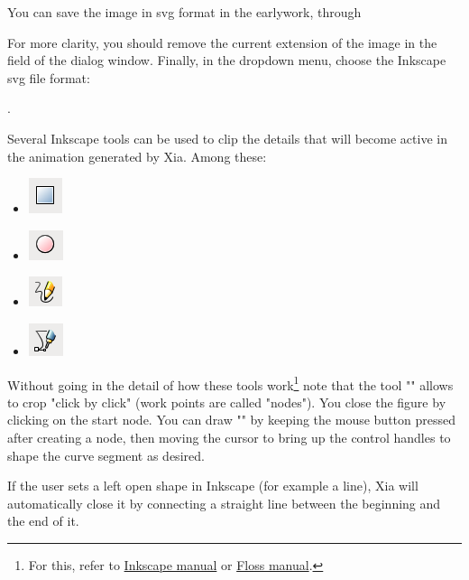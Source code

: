 You can save the image in svg format in the earlywork, 
through 


For more clarity, you should remove the current extension of the image 
in the field  of the dialog window. Finally, in the 
dropdown menu, choose the Inkscape svg file format:

.

Several Inkscape tools can be used to clip the details that
will become active in the animation generated by Xia. Among these:
\begin{itemize}
 \item \includegraphics[scale=0.5]{./images/rec_carre} 
 \item \includegraphics[scale=0.5]{./images/cercles} 
 \item \includegraphics[scale=0.5]{./images/lignes} 
 \item \includegraphics[scale=0.5]{./images/bezier} 
\end{itemize}

Without going in the detail of how these tools work\footnote{For this, 
refer to \href{http://inkscape.org/doc/shapes/tutorial-shapes.fr.html}{Inkscape manual} or \href{http://en.flossmanuals.net/inkscape/}{Floss manual}.} note that the tool "" 
allows to crop "click by click" (work points are called 
"nodes").  You close the figure by clicking on the start node. 
You can draw "" by keeping the mouse button pressed 
after creating a node, then moving the cursor to bring up the control handles 
to shape the curve segment as desired.


\begin{alerte}
  If the user sets a left open shape in Inkscape (for example a line), Xia will automatically close it  by connecting a straight line between the beginning and the end of it.
\end{alerte}


